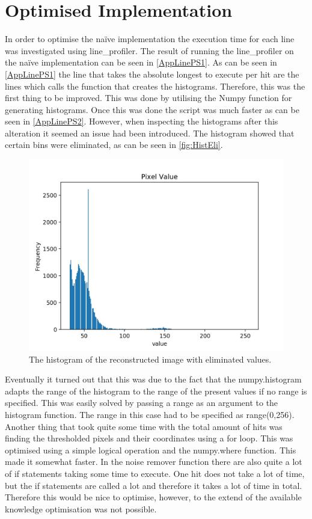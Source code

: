 \section{Optimised Implementation}
In order to optimise the na\"ive implementation the execution time for each line was investigated using line_profiler. The result of running the line_profiler on the na\"ive implementation can be seen in \autoref{AppLinePS1}. As can be seen in \autoref{AppLinePS1} the line that takes the absolute longest to execute per hit are the lines which calls the function that creates the histograms. Therefore, this was the first thing to be improved. This was done by utilising the Numpy function for generating histograms. Once this was done the script was much faster as can be seen in \autoref{AppLinePS2}. However, when inspecting the histograms after this alteration it seemed an issue had been introduced. The histogram showed that certain bins were eliminated, as can be seen in \autoref{fig:HistEli}. 

\begin{figure}[h]
\centering
\includegraphics[width=\textwidth]{figures/hist_troublespacing.jpg}
\caption{The histogram of the reconstructed image with eliminated values.}
\label{fig:HistEli}
\end{figure}

\noindent
Eventually it turned out that this was due to the fact that the numpy.histogram adapts the range of the histogram to the range of the present values if no range is specified. This was easily solved by passing a range as an argument to the histogram function. The range in this case had to be specified as range(0,256). 
Another thing that took quite some time with the total amount of hits was finding the thresholded pixels and their coordinates using a for loop. This was optimised using a simple logical operation and the numpy.where function. This made it somewhat faster. In the noise remover function there are also quite a lot of if statements taking some time to execute. One hit does not take a lot of time, but the if statements are called a lot and therefore it takes a lot of time in total. Therefore this would be nice to optimise, however, to the extend of the available knowledge optimisation was not possible. \\

